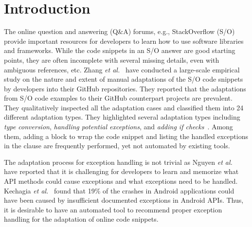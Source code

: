 \section{Introduction}
\label{sec:intro}

The online question and answering (Q\&A) forums, e.g., StackOverflow
(S/O) provide important resources for developers to learn how to use
software libraries and frameworks. While the code snippets in an S/O
answer are good starting points, they are often incomplete with
several missing details, even with ambiguous references, etc.  Zhang
{\em et al.}~\cite{zhang-icse19} have conducted a large-scale
empirical study on the nature and extent of manual adaptations of the
S/O code snippets by developers into their GitHub repositories.  They
reported that the adaptations from S/O code examples to their GitHub
counterpart projects are prevalent. They qualitatively inspected all
the adaptation cases and classified them into 24 different adaptation
types. They highlighted several adaptation types including {\em type
  conversion}, {\em handling potential exceptions}, and {\em adding if
  checks}~\cite{zhang-icse19}. Among them, adding a 
block to wrap the code snippet and listing the handled exceptions in
the  clause are frequently performed,
yet not automated by existing tools.

The adaptation process for exception handling is not trivial as Nguyen
{\em et al.}~\cite{xrank-fse20} have reported that it is challenging
for developers to learn and memorize what API methods could cause
exceptions and what exceptions need to be handled. Kechagia {\em et
  al.}~\cite{kechagia-msr14} found that 19\% of the crashes in Android
applications could have been caused by insufficient documented
exceptions in Android APIs. Thus, it is desirable to have an automated
tool to recommend proper exception handling for the adaptation of
online code snippets.

